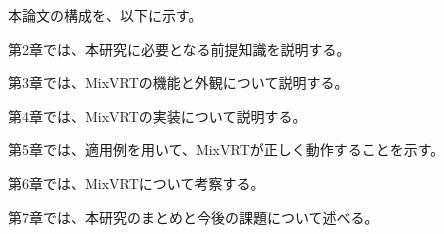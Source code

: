 


\par
本論文の構成を、以下に示す。\par
第2章では、本研究に必要となる前提知識を説明する。\par
第3章では、MixVRTの機能と外観について説明する。\par
第4章では、MixVRTの実装について説明する。\par
第5章では、適用例を用いて、MixVRTが正しく動作することを示す。\par
第6章では、MixVRTについて考察する。\par
第7章では、本研究のまとめと今後の課題について述べる。
